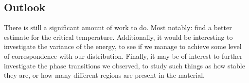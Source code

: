 \documentclass[a4paper, 10pt]{article}
\begin{document}
\subsection{Outlook}
There is still a significant amount of work to do. Most notably: find a better estimate for the critical temperature. Additionally, it would be interesting to investigate the variance of the energy, to see if we manage to achieve some level of correspondence with our distribution. Finally, it may be of interest to further investigate the phase transitions we observed, to study such things as how stable they are, or how many different regions are present in the material.
\end{document}
